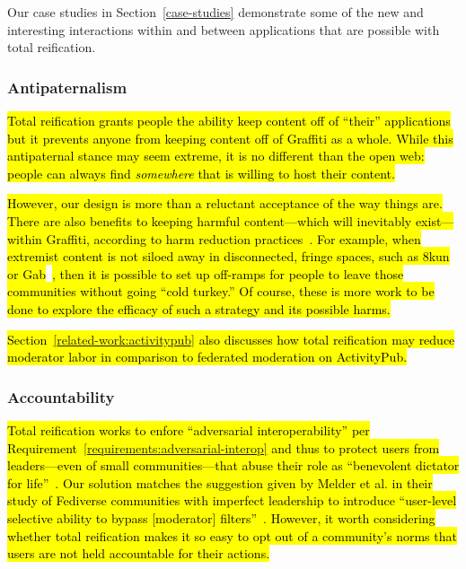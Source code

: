 Our case studies in Section~\ref{case-studies} demonstrate
some of the new and interesting interactions within and between applications
that are possible with total reification.

\subsubsection{Antipaternalism}

\hl{%
Total reification grants people the ability keep content off of ``their'' applications
but it prevents anyone from keeping content off of Graffiti as a whole.
While this antipaternal stance may seem extreme,
it is no different than the open web: people can always find
\emph{somewhere} that is willing to host their content.
}%

\hl{%
However, our design is more than a reluctant acceptance of the way things are.
There are also benefits to keeping harmful content---which will inevitably
exist---within Graffiti, according to harm reduction practices~\expandafter{\expandafter\cite{harmreduction}}.
For example, when extremist content is not siloed away in disconnected, fringe spaces,
such as 8kun or Gab}~\cite{8kun,gab}\hl{, then it is possible to set up off-ramps for
people to leave those communities without going ``cold turkey.''
Of course, these is more work to be done to explore the efficacy of
such a strategy and its possible harms.
}%

\hl{%
Section~{\ref{related-work:activitypub}} also discusses how total reification
may reduce moderator labor in comparison to federated moderation on ActivityPub.
}%

\subsubsection{Accountability}

\hl{%
Total reification works to enfore ``adversarial interoperability''
per Requirement~{\ref{requirements:adversarial-interop}}
and thus to protect users from leaders---even of small communities---that abuse their role as
``benevolent dictator for life''~{\cite{governablespaces}}.
Our solution matches the suggestion given by Melder et al.
in their study of Fediverse communities with imperfect leadership
to introduce ``user-level selective ability to bypass [moderator] filters''~{\cite{blocklistboundary}}.
However, it worth considering whether total reification makes it so easy
to opt out of a community's norms that users are not held accountable for their actions.
}%

